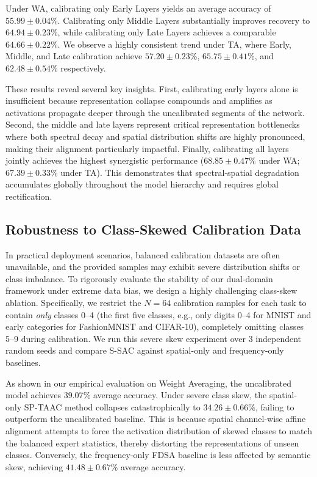 \documentclass{article}
\theoremstyle{plain}
\theoremstyle{definition}
\theoremstyle{remark}
\begin{document}
Under WA, calibrating only Early Layers yields an average accuracy of $55.99 \pm 0.04\%$. Calibrating only Middle Layers substantially improves recovery to $64.94 \pm 0.23\%$, while calibrating only Late Layers achieves a comparable $64.66 \pm 0.22\%$. We observe a highly consistent trend under TA, where Early, Middle, and Late calibration achieve $57.20 \pm 0.23\%$, $65.75 \pm 0.41\%$, and $62.48 \pm 0.54\%$ respectively.

These results reveal several key insights. First, calibrating early layers alone is insufficient because representation collapse compounds and amplifies as activations propagate deeper through the uncalibrated segments of the network. Second, the middle and late layers represent critical representation bottlenecks where both spectral decay and spatial distribution shifts are highly pronounced, making their alignment particularly impactful. Finally, calibrating all layers jointly achieves the highest synergistic performance ($68.85 \pm 0.47\%$ under WA; $67.39 \pm 0.33\%$ under TA). This demonstrates that spectral-spatial degradation accumulates globally throughout the model hierarchy and requires global rectification.

\subsection{Robustness to Class-Skewed Calibration Data}
In practical deployment scenarios, balanced calibration datasets are often unavailable, and the provided samples may exhibit severe distribution shifts or class imbalance. To rigorously evaluate the stability of our dual-domain framework under extreme data bias, we design a highly challenging class-skew ablation. Specifically, we restrict the $N = 64$ calibration samples for each task to contain \textit{only} classes 0--4 (the first five classes, e.g., only digits 0--4 for MNIST and early categories for FashionMNIST and CIFAR-10), completely omitting classes 5--9 during calibration. We run this severe skew experiment over 3 independent random seeds and compare S-SAC against spatial-only and frequency-only baselines.

As shown in our empirical evaluation on Weight Averaging, the uncalibrated model achieves $39.07\%$ average accuracy. Under severe class skew, the spatial-only SP-TAAC method collapses catastrophically to $34.26 \pm 0.66\%$, failing to outperform the uncalibrated baseline. This is because spatial channel-wise affine alignment attempts to force the activation distribution of skewed classes to match the balanced expert statistics, thereby distorting the representations of unseen classes. Conversely, the frequency-only FDSA baseline is less affected by semantic skew, achieving $41.48 \pm 0.67\%$ average accuracy. 
\end{document}
